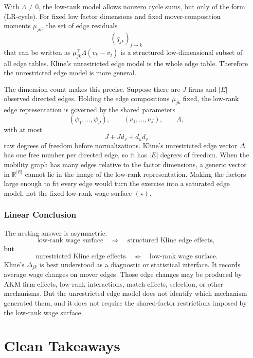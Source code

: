﻿\documentclass[11pt]{article}
\newcommand{\1}{\mathbf{1}}
\begin{document}
With $\Lambda\neq 0$, the low-rank model allows nonzero cycle sums, but only of
the form (LR-cycle). For fixed low factor dimensions and fixed mover-composition
moments $\mu_{jk}$, the set of edge residuals
\[
(q_{jk})_{j\to k}
\]
that can be written as $\mu_{jk}^\top\Lambda(v_k-v_j)$ is a structured
low-dimensional subset of all edge tables. Kline's unrestricted edge model is the
whole edge table. Therefore the unrestricted edge model is more general.

The dimension count makes this precise. Suppose there are $J$ firms and $|E|$
observed directed edges. Holding the edge compositions $\mu_{jk}$ fixed, the
low-rank edge representation is governed by the shared parameters
\[
(\psi_1,\ldots,\psi_J),\qquad
(v_1,\ldots,v_J),\qquad
\Lambda,
\]
with at most
\[
J+Jd_v+d_ud_v
\]
raw degrees of freedom before normalizations. Kline's unrestricted edge vector
$\Delta$ has one free number per directed edge, so it has $|E|$ degrees of
freedom. When the mobility graph has many edges relative to the factor
dimensions, a generic vector in $\mathbb R^{|E|}$ cannot lie in the image of the
low-rank representation. Making the factors large enough to fit every edge would
turn the exercise into a saturated edge model, not the fixed low-rank wage
surface $(\star)$.

\subsubsection{Linear Conclusion}

The nesting answer is asymmetric:
\[
\text{low-rank wage surface}
\quad\Longrightarrow\quad
\text{structured Kline edge effects},
\]
but
\[
\text{unrestricted Kline edge effects}
\quad\not\Longrightarrow\quad
\text{low-rank wage surface}.
\]
Kline's $\Delta_{jk}$ is best understood as a diagnostic or statistical
interface. It records average wage changes on mover edges. Those edge changes
may be produced by AKM firm effects, low-rank interactions, match effects,
selection, or other mechanisms. But the unrestricted edge model does not identify
which mechanism generated them, and it does not require the shared-factor
restrictions imposed by the low-rank wage surface.

\section{Clean Takeaways}
\end{document}
